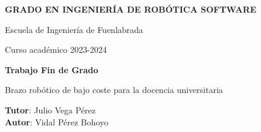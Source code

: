 \thispagestyle{empty}
\vspace{2cm}

\begin{figure}[htb]
  \centerline{}
\end{figure}

\begin{center}
  {\Large {\bf GRADO EN INGENIERÍA DE ROBÓTICA SOFTWARE}}
  \vspace{5mm}
 
  {\large {Escuela de Ingeniería de Fuenlabrada}}
  \vspace{5mm}

  {\large {Curso académico 2023-2024}}

  \vspace{1cm}

  {\large {\bf Trabajo Fin de Grado}}

  \vspace{2cm}

  {\Large {Brazo robótico de bajo coste para la docencia universitaria  \\[1cm] }}

  \vspace{5cm}
  {\bf Tutor}: Julio Vega Pérez \\
  {\bf Autor}: Vidal Pérez Bohoyo
\end{center}

\clearpage
\thispagestyle{empty}
